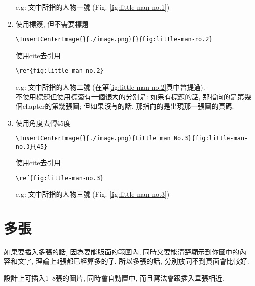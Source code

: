 \begin{enumerate}
{      e.g: 文中所指的人物一號 (Fig. \ref{fig:little-man-no.1}).
    } %

    \newpage

    \item
    {
      使用標簽, 但不需要標題\begin{verbatim}\InsertCenterImage{}{./image.png}{}{fig:little-man-no.2}\end{verbatim}
      使用cite去引用\begin{verbatim}\ref{fig:little-man-no.2}\end{verbatim}

      e.g: 文中所指的人物二號 (在第\ref{fig:little-man-no.2}頁中曾提過). \\

      不使用標題但使用標簽有一個很大的分別是: 如果有標題的話, 那指向的是第幾個chapter的第幾張圖; 但如果沒有的話, 那指向的是出現那一張圖的頁碼.
    } %

    \item
    {
      使用角度去轉45度\begin{verbatim}\InsertCenterImage{}{./image.png}{Little man No.3}{fig:little-man-no.3}{45}\end{verbatim}
      使用cite去引用\begin{verbatim}\ref{fig:little-man-no.3}\end{verbatim}


      e.g: 文中所指的人物三號 (Fig. \ref{fig:little-man-no.3}).
    } %

  \end{enumerate}

\newpage
\section{多張}

  如果要插入多張的話, 因為要能版面的範圍內, 同時又要能清楚顯示到你圖中的內容和文字, 理論上4張都已經算多的了. 所以多張的話, 分別放同不到頁面會比較好.

  設計上可插入1~8張的圖片, 同時會自動置中, 而且寫法會跟插入單張相近.

